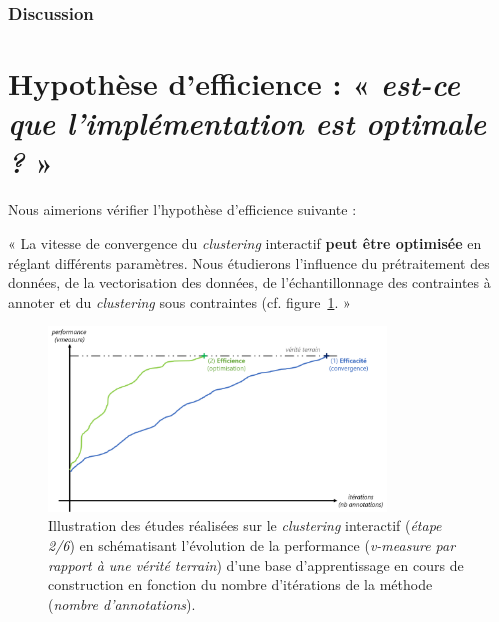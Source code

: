 
			\subsubsection{Discussion}
				
	

    \section{Hypothèse d'efficience : « \textit{est-ce que l'implémentation est optimale ?} »}
	\label{section:4.2-HYPOTHESE-EFFICIENCE}
	
		Nous aimerions vérifier l'hypothèse d'efficience suivante :

		\begin{tcolorbox}[
			title=\textbf{Hypothèse d'efficience},
			colback=gray!20,
			colframe=gray!50!black!75,
			width=\linewidth
		]
			« La vitesse de convergence du \textit{clustering} interactif \textbf{peut être optimisée} en réglant différents paramètres. Nous étudierons l'influence du prétraitement des données, de la vectorisation des données, de l'échantillonnage des contraintes à annoter et du \textit{clustering} sous contraintes (cf. figure~\ref{figure:HYPOTHESE-EFFICIENCE}. »
			
			
			\begin{figure}[H]
				\centering
				\includegraphics[width=0.8\textwidth]{figures/hypotheses-02-efficience}
				\caption{Illustration des études réalisées sur le \textit{clustering} interactif (\textit{étape 2/6}) en schématisant l'évolution de la performance (\textit{v-measure par rapport à une vérité terrain}) d'une base d'apprentissage en cours de construction en fonction du nombre d'itérations de la méthode (\textit{nombre d'annotations}).}
				\label{figure:HYPOTHESE-EFFICIENCE}
			\end{figure}

		\end{tcolorbox}
		
